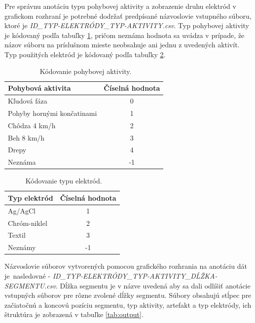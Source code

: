 Pre správnu anotáciu typu pohybovej aktivity a zobrazenie druhu elektród v grafickom rozhraní je potrebné dodržať predpísané názvoslovie vstupného súboru, ktoré je \textit{ID\_TYP-ELEKTRÓDY\_TYP-AKTIVITY.csv}. Typ pohybovej aktivity je kódovaný podľa tabuľky \ref{tab:labels_activity}, pričom neznáma hodnota sa uvádza v prípade, že názov súboru na príslušnom mieste neobsahuje ani jednu z uvedených aktivít. Typ použitých elektród je kódovaný podľa tabuľky \ref{tab:labels_electrode}.

\begin{table}[H]\centering
\caption[Kódovanie pohybovej aktivity.]{~Kódovanie pohybovej aktivity.}\label{tab:labels_activity}
    \begin{tabular}{l|c}
    	\textbf{Pohybová aktivita}  & \textbf{Číselná hodnota}    \tabularnewline \hline 
     	Kľudová fáza                & 0	                          \tabularnewline \hline
     	Pohyby hornými končatinami 	& 1	                          \tabularnewline \hline
        Chôdza 4 km/h 	            & 2	                          \tabularnewline \hline
        Beh 8 km/h                  & 3	                          \tabularnewline \hline
        Drepy                       & 4	                          \tabularnewline \hline
        Neznáma                     & -1                          \tabularnewline
    \end{tabular}
\end{table}

\begin{table}[H]\centering
\caption[Kódovanie typu elektród.]{~Kódovanie typu elektród.}\label{tab:labels_electrode}
    \begin{tabular}{l|c}
    	\textbf{Typ elektród}  & \textbf{Číselná hodnota}     \tabularnewline \hline 
     	Ag/AgCl                & 1	                          \tabularnewline \hline
     	Chróm-niklel	       & 2	                          \tabularnewline \hline
        Textil	               & 3	                          \tabularnewline \hline
        Neznámy	               & -1	                          \tabularnewline
    \end{tabular}
\end{table}

Názvoslovie súborov vytvorených pomocou grafického rozhrania na anotáciu dát je~nasledovné - \textit{ID\_TYP-ELEKTRÓDY\_TYP-AKTIVITY\_DĹŽKA-SEGMENTU.csv}. Dĺžka segmentu je v názve uvedená aby sa dali odlíšiť anotácie vstupných súborov pre rôzne zvolené dĺžky segmentu. Súbory obsahujú stĺpec pre začiatočnú a koncovú pozíciu segmentu, typ aktivity, artefakt a typ elektródy, ich štruktúra je zobrazená v tabuľke \ref{tab:output}. 

